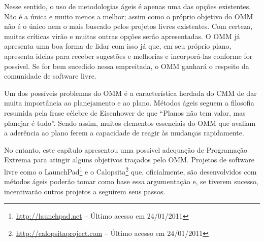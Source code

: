 Nesse sentido, o uso de metodologias ágeis é apenas uma das opções
existentes.  Não é a única e muito menos a melhor; assim como o
próprio objetivo do OMM não é o único nem o mais buscado pelos
projetos livres existentes. Com certeza, muitas críticas virão e
muitas outras opções serão apresentadas. O OMM já apresenta uma boa
forma de lidar com isso já que, em seu próprio plano, apresenta ideias
para receber sugestões e melhorias e incorporá-las conforme for
possível.  Se for bem sucedido nessa empreitada, o OMM ganhará o
respeito da comunidade de software livre.

Um dos possíveis problemas do OMM é a característica herdada do CMM de
dar muita importância ao planejamento e ao plano. Métodos ágeis seguem
a filosofia resumida pela frase célebre de Eisenhower de que ``Planos
não tem valor, mas planejar é tudo''. Sendo assim, muitos elementos
essenciais do OMM que avaliam a aderência ao plano ferem a capacidade
de reagir às mudanças rapidamente.

No entanto, este capítulo apresentou uma possível adequação de
Programação Extrema para atingir alguns objetivos traçados pelo
OMM. Projetos de software livre como o
LaunchPad\footnote{\url{http://launchpad.net} -- Último acesso em
  24/01/2011} e o Calopsita\footnote{\url{http://calopsitaproject.com}
  -- Último acesso em 24/01/2011} que, oficialmente, são desenvolvidos
com métodos ágeis poderão tomar como base essa argumentação e, se
tiverem sucesso, incentivarão outros projetos a seguirem seus passos.

